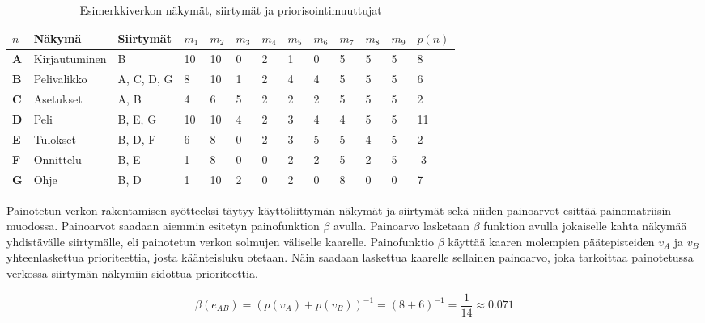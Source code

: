   \begin{table}[H]
    \caption{Esimerkkiverkon näkymät, siirtymät ja priorisointimuuttujat}
    \label{tab:esimerkki_verkon_priorisointi_muuttujat}
    \centering
    \begin{tabular}{lllllllllllll} \hline
    \(n\) & \textbf{Näkymä} & \textbf{Siirtymät} & \(m_1\) & \(m_2\) & \(m_3\) & \(m_4\) & \(m_5\) & \(m_6\) & \(m_7\) & \(m_8\) & \(m_9\) & \(p(n)\) \\ \hline
    \textbf{A} & Kirjautuminen & B & 10 & 10 & 0 & 2 & 1 & 0 & 5 & 5 & 5 & 8 \\
    \textbf{B} & Pelivalikko & A, C, D, G & 8 & 10 & 1 & 2 & 4 & 4 & 5 & 5 & 5 & 6 \\
    \textbf{C} & Asetukset & A, B & 4 & 6 & 5 & 2 & 2 & 2 & 5 & 5 & 5 & 2 \\
    \textbf{D} & Peli & B, E, G & 10 & 10 & 4 & 2 & 3 & 4 & 4 & 5 & 5 & 11 \\
    \textbf{E} & Tulokset & B, D, F & 6 & 8 & 0 & 2 & 3 & 5 & 5 & 4 & 5 & 2 \\
    \textbf{F} & Onnittelu & B, E & 1 & 8 & 0 & 0 & 2 & 2 & 5 & 2 & 5 & -3 \\
    \textbf{G} & Ohje & B, D & 1 & 10 & 2 & 0 & 2 & 0 & 8 & 0 & 0 & 7 \\ \hline
    \end{tabular}
  \end{table}

  Painotetun verkon rakentamisen syötteeksi täytyy käyttöliittymän näkymät ja siirtymät sekä niiden painoarvot esittää painomatriisin muodossa.
  Painoarvot saadaan aiemmin esitetyn painofunktion \(\beta\) avulla.
  Painoarvo lasketaan \(\beta\) funktion avulla jokaiselle kahta näkymää yhdistävälle siirtymälle, eli painotetun verkon solmujen väliselle kaarelle.
  Painofunktio \(\beta\) käyttää kaaren molempien päätepisteiden \(v_A\) ja \(v_B\) yhteenlaskettua prioriteettia, josta käänteisluku otetaan.
  Näin saadaan laskettua kaarelle sellainen painoarvo, joka tarkoittaa painotetussa verkossa siirtymän näkymiin sidottua prioriteettia.

  \[\beta(e_{AB}) = (p(v_A) + p(v_B))^{-1} = (8 + 6)^{-1} = \frac{1}{14} \approx 0.071\]

